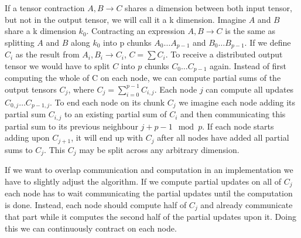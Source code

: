 If a tensor contraction $A,B \rightarrow C$ shares a dimension between both input tensor, but not in the output tensor, we will call it a k dimension.
Imagine $A$ and $B$ share a k dimension $k_0$.
Contracting an expression $A,B \rightarrow C$ is the same as splitting $A$ and $B$ along $k_0$ into p chunks $A_0\dots A_{p-1}$ and $B_0\dots B_{p-1}$.
If we define $C_i$ as the result from $A_i,B_i \rightarrow C_i$, $C=\sum{C_i}$.
To receive a distributed output tensor we would have to split $C$ into $p$ chunks $C_0\dots C_{p-1}$ again.
Instead of first computing the whole of C on each node, we can compute partial sums of the output tensors $C_j$, where 
$C_j = \sum_{i=0}^{p-1} C_{i,j}$.
Each node $j$ can compute all updates $C_{0,j}\dots C_{p-1,j}$.
To end each node on its chunk $C_j$ we imagine each node adding its partial sum $C_{i,j}$ to an existing partial sum of $C_i$ and then communicating this partial sum to its previous neighbour $j+p-1 \mod p$.
If each node starts adding upon $C_{j+1}$, it will end up with $C_j$ after all nodes have added all partial sums to $C_j$.
This $C_j$ may be split across any arbitrary dimension.

If we want to overlap communication and computation in an implementation we have to slightly adjust the algorithm.
If we compute partial updates on all of $C_j$ each node has to wait communicating the partial updates until the computation is done.
Instead, each node should compute half of $C_j$ and already communicate that part while it computes the second half of the partial updates upon it.
Doing this we can continuously contract on each node.